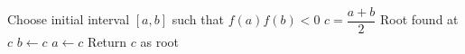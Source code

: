 \begin{algorithm}[H]
\caption{Bisection Method}
\begin{algorithmic}[1]
\STATE Choose initial interval $[a,b]$ such that $f(a)f(b) < 0$
\REPEAT
    \STATE $c = \dfrac{a+b}{2}$
        \STATE Root found at $c$
        \STATE $b \gets c$
    \ELSE
        \STATE $a \gets c$
    \ENDIF
{}
\STATE Return $c$ as root
\end{algorithmic}
\end{algorithm}
